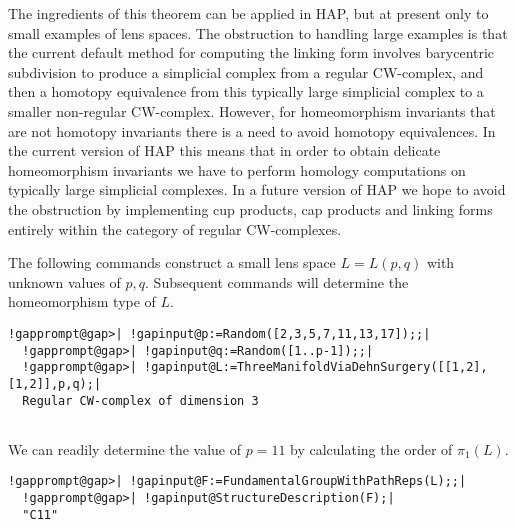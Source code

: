 \documentclass[a4paper,11pt]{report}
\begin{document}
{{The ingredients of this theorem can be applied in HAP, but at present only to
small examples of lens spaces. The obstruction to handling large examples is
that the current default method for computing the linking form involves
barycentric subdivision to produce a simplicial complex from a regular
CW-complex, and then a homotopy equivalence from this typically large
simplicial complex to a smaller non-regular CW-complex. However, for
homeomorphism invariants that are not homotopy invariants there is a need to
avoid homotopy equivalences. In the current version of HAP this means that in
order to obtain delicate homeomorphism invariants we have to perform homology
computations on typically large simplicial complexes. In a future version of
HAP we hope to avoid the obstruction by implementing cup products, cap
products and linking forms entirely within the category of regular
CW-complexes. 

The following commands construct a small lens space $L=L(p,q)$ with unknown values of $p,q$. Subsequent commands will determine the homeomorphism type of $L$. 
\begin{Verbatim}[commandchars=!@|,fontsize=\small,frame=single,label=Example]
  !gapprompt@gap>| !gapinput@p:=Random([2,3,5,7,11,13,17]);;|
  !gapprompt@gap>| !gapinput@q:=Random([1..p-1]);;|
  !gapprompt@gap>| !gapinput@L:=ThreeManifoldViaDehnSurgery([[1,2],[1,2]],p,q);|
  Regular CW-complex of dimension 3
  
\end{Verbatim}
 We can readily determine the value of $p=11$ by calculating the order of $\pi_1(L)$. 
\begin{Verbatim}[commandchars=!@|,fontsize=\small,frame=single,label=Example]
  !gapprompt@gap>| !gapinput@F:=FundamentalGroupWithPathReps(L);;|
  !gapprompt@gap>| !gapinput@StructureDescription(F);|
  "C11"
  
\end{Verbatim}
 

}}
\end{document}
